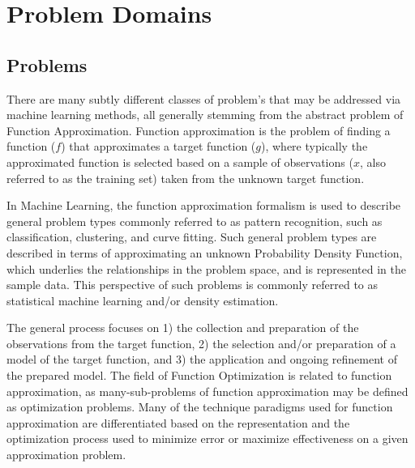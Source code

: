 
\section{Problem Domains} 
\label{intro:problemdomains}

\subsection{Problems}
\label{subsec:problems}
There are many subtly different classes of problem's that may be addressed via machine learning methods, all generally stemming from the abstract problem of Function Approximation. Function approximation is the problem of finding a function ($f$) that approximates a target function ($g$), where typically the approximated function is selected based on a sample of observations ($x$, also referred to as the training set) taken from the unknown target function.

In Machine Learning, the function approximation formalism is used to describe general problem types commonly referred to as pattern recognition, such as classification, clustering, and curve fitting. Such general problem types are described in terms of approximating an unknown Probability Density Function, which underlies the relationships in the problem space, and is represented in the sample data. This perspective of such problems is commonly referred to as statistical machine learning and/or density estimation.

The general process focuses on 1) the collection and preparation of the observations from the target function, 2) the selection and/or preparation of a model of the target function, and 3) the application and ongoing refinement of the prepared model. 
The field of Function Optimization is related to function approximation, as many-sub-problems of function approximation may be defined as optimization problems. Many of the technique paradigms used for function approximation are differentiated based on the representation and the optimization process used to minimize error or maximize effectiveness on a given approximation problem.

